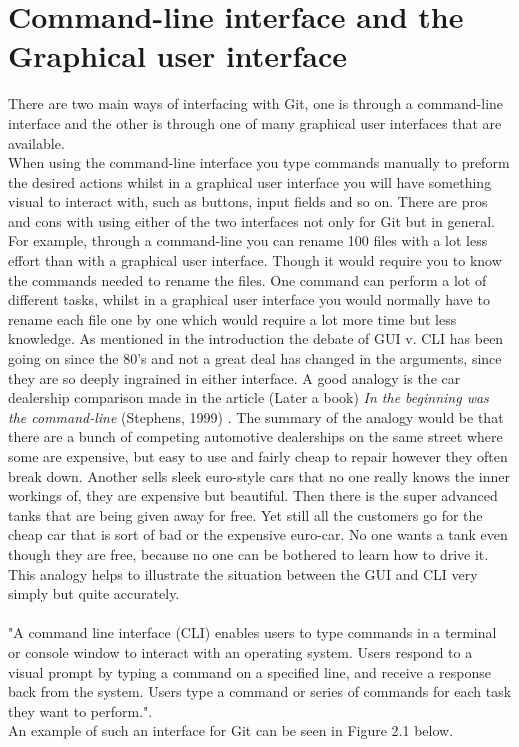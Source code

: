 \documentclass[a4paper,oneside]{bth} %
\begin{document}
			\section{Command-line interface and the Graphical user interface}
			There are two main ways of interfacing with Git, one is through a command-line interface and the other is through one of many graphical user interfaces that are available. \cite{GitGUIs}\\
			
			When using the command-line interface you type commands manually to preform the desired actions whilst in a graphical user interface you will have something visual to interact with, such as buttons, input fields and so on.
			There are pros and cons with using either of the two interfaces not only for Git but in general.
			For example, through a command-line you can rename 100 files with a lot less effort than with a graphical user interface. Though it would require you to know the commands needed to rename the files. One command can perform a lot of different tasks, whilst in a graphical user interface you would normally have to rename each file one by one which would require a lot more time but less knowledge. As mentioned in the introduction the debate of GUI v. CLI has been going on since the 80's and not a great deal has changed in the arguments, since they are so deeply ingrained in either interface. 
			A good analogy is the car dealership comparison made in the article (Later a book) \textit{In the beginning was the command-line} (Stephens, 1999) \cite{InTheBeginning}. The summary of the analogy would be that there are a bunch of competing automotive dealerships on the same street where some are expensive, but easy to use and fairly cheap to repair however they often break down. Another sells sleek euro-style cars that no one really knows the inner workings of, they are expensive but beautiful. Then there is the super advanced tanks that are being given away for free. Yet still all the customers go for the cheap car that is sort of bad or the expensive euro-car. No one wants a tank even though they are free, because no one can be bothered to learn how to drive it. 
			This analogy helps to illustrate the situation between the GUI and CLI very simply but quite accurately.
			\\\\
			"A command line interface (CLI) enables users to type commands in a terminal or console window to interact with an operating system. Users respond to a visual prompt by typing a command on a specified line, and receive a response back from the system. Users type a command or series of commands for each task they want to perform."\cite{OracleCLIAndGUI}.\\
			An example of such an interface for Git can be seen in Figure 2.1 below.
			
\end{document}
